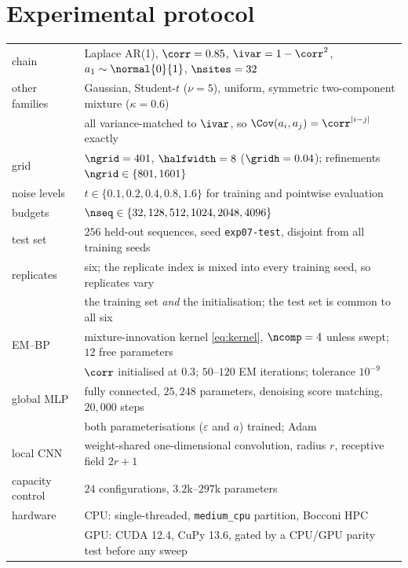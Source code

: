 \section{Experimental protocol}
\label{app:protocol}

\begin{center}
\small
\begin{tabular}{ll}
\toprule
chain & Laplace AR(1), $\corr=0.85$, $\ivar=1-\corr^2$, $a_1\sim\normal{0}{1}$, $\nsites=32$ \\
other families & Gaussian, Student-$t$ ($\nu=5$), uniform, symmetric two-component mixture
                 ($\kappa=0.6$) \\
                & all variance-matched to $\ivar$, so $\Cov(a_i,a_j)=\corr^{|i-j|}$ exactly \\
grid & $\ngrid=401$, $\halfwidth=8$ ($\gridh=0.04$); refinements $\ngrid\in\{801,1601\}$ \\
noise levels & $t\in\{0.1,0.2,0.4,0.8,1.6\}$ for training and pointwise evaluation \\
budgets & $\nseq\in\{32,128,512,1024,2048,4096\}$ \\
test set & $256$ held-out sequences, seed \texttt{exp07-test}, disjoint from all training seeds \\
replicates & six; the replicate index is mixed into every training seed, so replicates vary \\
           & the training set \emph{and} the initialisation; the test set is common to all six \\
\midrule
EM--BP & mixture-innovation kernel \eqref{eq:kernel}, $\ncomp=4$ unless swept;
         $12$ free parameters \\
       & $\corr$ initialised at $0.3$; $50$--$120$ EM iterations; tolerance $10^{-9}$ \\
global MLP & fully connected, $25{,}248$ parameters, denoising score matching, $20{,}000$
             steps \\
           & both parameterisations ($\varepsilon$ and $a$) trained; Adam \\
local CNN & weight-shared one-dimensional convolution, radius $r$, receptive field $2r+1$ \\
capacity control & $24$ configurations, $3.2$k--$297$k parameters \\
\midrule
hardware & CPU: single-threaded, \texttt{medium\_cpu} partition, Bocconi HPC \\
         & GPU: CUDA 12.4, CuPy 13.6, gated by a CPU/GPU parity test before any sweep \\
\bottomrule
\end{tabular}
\end{center}

